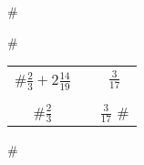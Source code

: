 #\documentclass[12pt]{b ook}
\begin{document}
#\begin{tabular}{ccc}
#$\frac{2}{3} + 2\frac{14}{19}$ & \hspace{1 cm} & $\frac{3}{17}$\\\\
#$\frac{2}{3}$ & \hspace{1 cm} & $\frac{3}{17}$
#\end{tabular}
#
\end{document}
